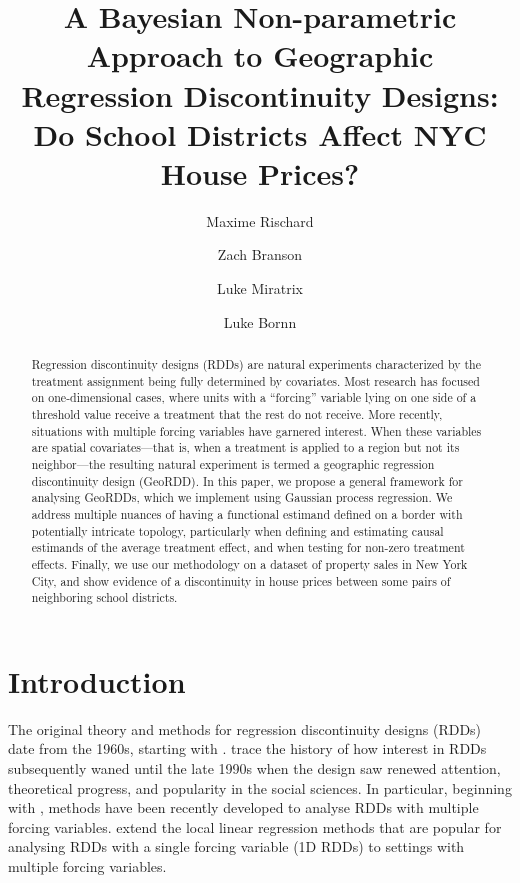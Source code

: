 \documentclass[letter]{article}
\title{
	A Bayesian Non-parametric Approach to Geographic Regression Discontinuity Designs:
	Do School Districts Affect NYC House Prices?
}
\author[a]{Maxime Rischard}
\author[a]{Zach Branson}
\author[b]{Luke Miratrix}
\author[c]{Luke Bornn}
\affil[a]{Department of Statistics, Harvard University}
\affil[b]{Graduate School of Education, Harvard University}
\affil[c]{Simon Fraser University}
\renewcommand{\cite}[1]{\citet{#1}}
\begin{document}
    
    
    \maketitle
    
    

    




\begin{abstract}
    	Regression discontinuity designs (RDDs) are natural experiments characterized by the treatment assignment being fully determined by covariates.
Most research has focused on one-dimensional cases, where units with a ``forcing'' variable lying on one side of a threshold value receive a treatment that the rest do not receive.
More recently, situations with multiple forcing variables have garnered interest.
When these variables are spatial covariates---that is, when a treatment is applied to a region but not its neighbor---the resulting natural experiment is termed a geographic regression discontinuity design (GeoRDD).
In this paper, we propose a general framework for analysing GeoRDDs, which we implement using Gaussian process regression.
We address multiple nuances of having a functional estimand defined on a border with potentially intricate topology, particularly when defining and estimating causal estimands of the average treatment effect, and when testing for non-zero treatment effects.
Finally, we use our methodology on a dataset of property sales in New York City,
and show evidence of a discontinuity in house prices between some pairs of neighboring school districts.
    

\end{abstract}
    	\hypertarget{introduction}{%
\section{Introduction}\label{introduction}}
    


    	The original theory and methods for regression discontinuity designs (RDDs) date from the 1960s, starting with \cite{thistlethwaite1960regression}.
\cite{cook2008waiting} trace the history of how interest in RDDs subsequently waned until the late 1990s when the design saw renewed attention, theoretical progress, and popularity in the social sciences.
In particular, beginning with \cite{papay2011extending}, methods have been recently developed to analyse RDDs with multiple forcing variables.
\cite{imbens2011regression} extend the local linear regression methods \citep[see][]{imbensrdd} that are popular for analysing RDDs with a single forcing variable (1D RDDs) to settings with multiple forcing variables.
    
\end{document}
